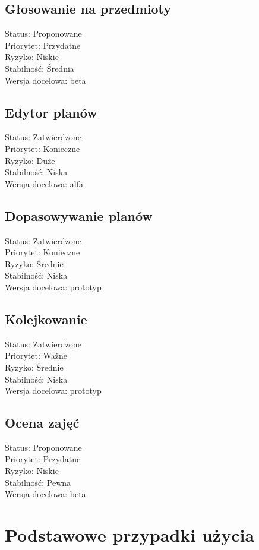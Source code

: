 \documentclass[11pt,leqno]{article}
\begin{document}
\subsection{Głosowanie na przedmioty}
Status: Proponowane \\
Priorytet: Przydatne \\
Ryzyko: Niskie \\
Stabilność: Średnia \\
Wersja docelowa: beta \\
\subsection{Edytor planów}
Status: Zatwierdzone \\
Priorytet: Konieczne \\
Ryzyko: Duże \\
Stabilność: Niska \\
Wersja docelowa: alfa \\
\subsection{Dopasowywanie planów}
Status: Zatwierdzone \\
Priorytet: Konieczne \\
Ryzyko: Średnie \\
Stabilność: Niska \\
Wersja docelowa: prototyp \\
\subsection{Kolejkowanie}
Status: Zatwierdzone \\
Priorytet: Ważne \\
Ryzyko: Średnie \\
Stabilność: Niska \\
Wersja docelowa: prototyp \\
\subsection{Ocena zajęć}
Status: Proponowane \\
Priorytet: Przydatne \\
Ryzyko: Niskie \\
Stabilność: Pewna \\
Wersja docelowa: beta 

\section{Podstawowe przypadki użycia}
\end{document}
